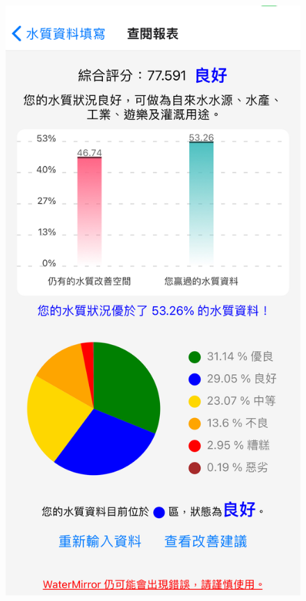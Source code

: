 \documentclass[12pt,a4paper]{article}
\begin{document}
\begin{enumerate}
\begin{enumerate}[label=\arabic*.]
\begin{enumerate}[label=3-2-\arabic*.]
\begin{figure}[H]
                \vspace{1em} %
                
                \begin{minipage}{0.3\textwidth}
                    \centering
                    \includegraphics[width=\textwidth]{resources/image/front-end/APP報表輸出.png}

\end{minipage}
\end{figure}
\end{enumerate}
\end{enumerate}
\end{enumerate}
\end{document}
